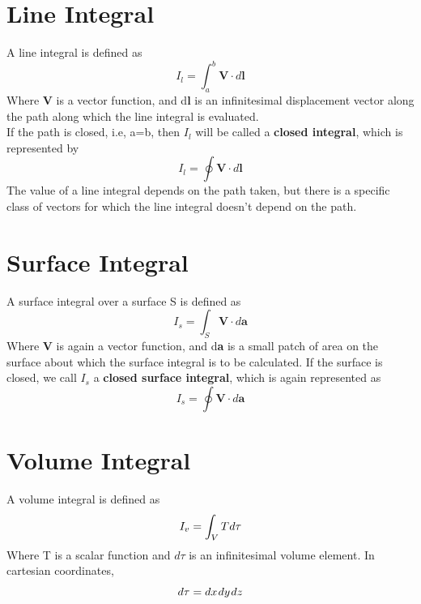 \documentclass[12pt]{article}
\begin{document}
\section{Line Integral}
A line integral is defined as 
\begin{equation}
    I_l = \int_{a}^{b} \mathbf{V}\cdot d\mathbf{l}
\end{equation}
Where \textbf{V} is a vector function, and d\textbf{l} is an infinitesimal displacement vector along the path along which the line integral is evaluated. \\
If the path is closed, i.e, a=b, then $I_l$ will be called a \textbf{closed integral}, which is represented by 
\begin{equation}
    I_l = \oint \mathbf{V}\cdot d\mathbf{l}
\end{equation}
The value of a line integral depends on the path taken, but there is a specific class of vectors for which the line integral doesn't depend on the path.

\section{Surface Integral}
A surface integral over a surface S is defined as
\begin{equation}
    I_s = \int_S \mathbf{V}\cdot d\mathbf{a}
\end{equation}
Where \textbf{V} is again a vector function, and d\textbf{a} is a small patch of area on the surface about which the surface integral is to be calculated. If the surface is closed, we call $I_s$ a \textbf{closed surface integral}, which 
is again represented as 
\begin{equation}
    I_s = \oint \mathbf{V}\cdot d\mathbf{a}
\end{equation}

\section{Volume Integral}
A volume integral is defined as 
\begin{equation}
    I_v=\int_{V}T\hspace{0.01cm}d\tau 
\end{equation}
Where T is a scalar function and $d\tau$ is an infinitesimal volume element. In cartesian coordinates,
\begin{equation}
    d\tau=dx\hspace{0.03cm}dy\hspace{0.03cm}dz
\end{equation}
\end{document}
